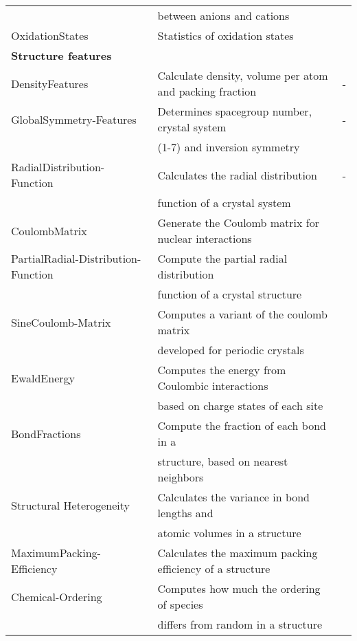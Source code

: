 \begin{center}
\begin{longtable}{M{3.5cm} M{6.5cm} M{2.0cm}}
   &  between anions and cations & \\ 
  OxidationStates & Statistics of oxidation states & \cite{Deml2016}  \\   
\hline 
  \textbf{Structure features} & & \\   
  DensityFeatures & Calculate density, volume per atom and packing fraction & - \\   
  GlobalSymmetry-Features & Determines spacegroup number, crystal system  & - \\   
   & (1-7) and inversion symmetry & \\ 
  RadialDistribution-Function & Calculates the radial distribution  & - \\   
   & function of a crystal system & \\ 
  CoulombMatrix & Generate the Coulomb matrix for nuclear interactions  & \cite{Rupp2012}  \\    
  PartialRadial-Distribution-Function & Compute the partial radial distribution  & \cite{Schuett2014}  \\   
   & function of a crystal structure & \\ 
  SineCoulomb-Matrix & Computes a variant of the coulomb matrix & \cite{Faber2015}  \\   
   & developed for periodic crystals & \\ 
  EwaldEnergy & Computes the energy from Coulombic interactions  & \cite{Ewald1921}  \\   
   & based on charge states of each site & \\ 
  BondFractions & Compute the fraction of each bond in a  & \cite{Hansen2015}  \\   
   & structure, based on nearest neighbors & \\ 
  Structural Heterogeneity & Calculates the variance in bond lengths and  & \cite{Ward2017}  \\   
   & atomic volumes in a structure & \\ 
  MaximumPacking-Efficiency & Calculates the maximum packing efficiency of a structure & \cite{Ward2017} \\   
  Chemical-Ordering & Computes how much the ordering of species  & \cite{Ward2017}  \\   
   & differs from random in a structure & \\ 

\end{longtable}
\end{center}
